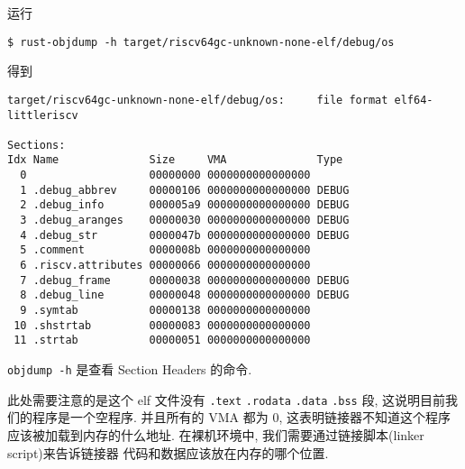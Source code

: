 \documentclass{ctexart}
\begin{document}
运行
\begin{lstlisting}
$ rust-objdump -h target/riscv64gc-unknown-none-elf/debug/os
\end{lstlisting}
得到
\begin{lstlisting}
target/riscv64gc-unknown-none-elf/debug/os:     file format elf64-littleriscv

Sections:
Idx Name              Size     VMA              Type
  0                   00000000 0000000000000000
  1 .debug_abbrev     00000106 0000000000000000 DEBUG
  2 .debug_info       000005a9 0000000000000000 DEBUG
  3 .debug_aranges    00000030 0000000000000000 DEBUG
  4 .debug_str        0000047b 0000000000000000 DEBUG
  5 .comment          0000008b 0000000000000000
  6 .riscv.attributes 00000066 0000000000000000
  7 .debug_frame      00000038 0000000000000000 DEBUG
  8 .debug_line       00000048 0000000000000000 DEBUG
  9 .symtab           00000138 0000000000000000
 10 .shstrtab         00000083 0000000000000000
 11 .strtab           00000051 0000000000000000
\end{lstlisting}
\verb|objdump -h| 是查看 Section Headers 的命令.

此处需要注意的是这个 elf 文件没有
\verb|.text| \verb|.rodata| \verb|.data| \verb|.bss| 段,
这说明目前我们的程序是一个空程序.
并且所有的 VMA 都为 0,
这表明链接器不知道这个程序应该被加载到内存的什么地址.
在裸机环境中, 我们需要通过链接脚本(linker script)来告诉链接器
代码和数据应该放在内存的哪个位置.
\end{document}
